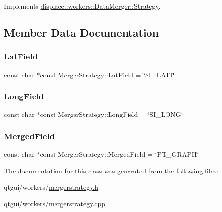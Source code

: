 Implements \mbox{\hyperlink{classdisplace_1_1workers_1_1_data_merger_1_1_strategy_a789b4eee626c5947091e5153e450c91a}{displace\+::workers\+::\+Data\+Merger\+::\+Strategy}}.



\subsection{Member Data Documentation}
\mbox{\label{classdisplace_1_1workers_1_1_merger_strategy_af199860f186a2ff89c03981792e4080f}} 
\subsubsection{\texorpdfstring{LatField}{LatField}}
{\footnotesize\ttfamily const char $\ast$const Merger\+Strategy\+::\+Lat\+Field = \char`\"{}S\+I\+\_\+\+L\+A\+TI\char`\"{}\hspace{0.3cm}{\ttfamily [static]}}

\mbox{\label{classdisplace_1_1workers_1_1_merger_strategy_aebef512db4733490f76e2e3bdc03cc0b}} 
\subsubsection{\texorpdfstring{LongField}{LongField}}
{\footnotesize\ttfamily const char $\ast$const Merger\+Strategy\+::\+Long\+Field = \char`\"{}S\+I\+\_\+\+L\+O\+NG\char`\"{}\hspace{0.3cm}{\ttfamily [static]}}

\mbox{\label{classdisplace_1_1workers_1_1_merger_strategy_acacd6c613d758f0cd5d2395b453ca6ad}} 
\subsubsection{\texorpdfstring{MergedField}{MergedField}}
{\footnotesize\ttfamily const char $\ast$const Merger\+Strategy\+::\+Merged\+Field = \char`\"{}P\+T\+\_\+\+G\+R\+A\+PH\char`\"{}\hspace{0.3cm}{\ttfamily [static]}}



The documentation for this class was generated from the following files\+:\begin{DoxyCompactItemize}
\item 
qtgui/workers/\mbox{\hyperlink{mergerstrategy_8h}{mergerstrategy.\+h}}\item 
qtgui/workers/\mbox{\hyperlink{mergerstrategy_8cpp}{mergerstrategy.\+cpp}}\end{DoxyCompactItemize}
